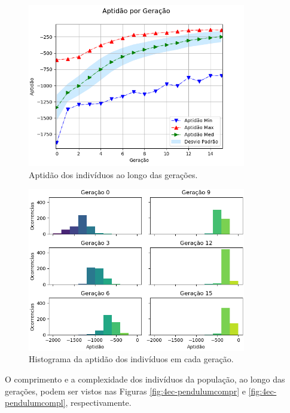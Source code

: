 \begin{figure}[H]
	\centering
	\includegraphics[width=0.85\textwidth]{02_desenvolvimento/04_EC_Fig_PendulumAptGer.png}
	\caption{Aptidão dos indivíduos ao longo das gerações.}
	\label{fig:4ec-pendulumaptger}
\end{figure}

\begin{figure}[H]
	\centering
	\includegraphics[width=0.85\textwidth]{02_desenvolvimento/04_EC_Fig_PendulumAptHist.png}
	\caption{Histograma da aptidão dos indivíduos em cada geração.}
	\label{fig:4ec-pendulumapthist}
\end{figure}

O comprimento e a complexidade dos indivíduos da população, ao longo das gerações, podem ser vistos nas Figuras \ref{fig:4ec-pendulumcompr} e \ref{fig:4ec-pendulumcompl}, respectivamente.

